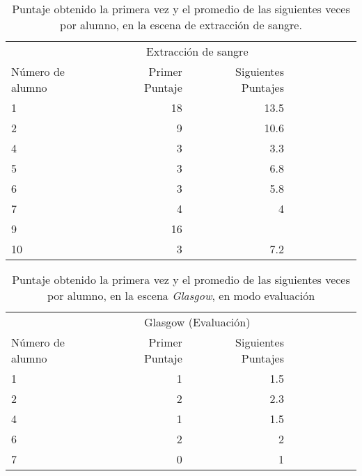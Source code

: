 \begin{table}[!hbt]
\centering
\begin{tabular}{lrrrrrrrr}
\toprule
                   & \multicolumn{2}{c}{Extracción de sangre} \\
                   \cmidrule(lr){2-3} 
Número de alumno   & Primer Puntaje                            & Siguientes Puntajes \\
\midrule
 1       & 18  & 13.5 \\
 2       & 9 & 10.6 \\
 4       & 3 & 3.3 \\
 5       & 3 & 6.8  \\
 6       & 3 & 5.8 \\
 7       & 4 & 4 \\
 9       & 16  &  \\
10       & 3 & 7.2 \\
\bottomrule
\end{tabular}
\caption{Puntaje obtenido la primera vez y el promedio de las siguientes veces por alumno, en la escena de
    extracción de sangre.}
\label{tab:log_hemocultivo_puntaje}
\end{table}


\begin{table}[!hbt]
\centering
\begin{tabular}{lrrrrrrrr}
\toprule
& \multicolumn{2}{c}{Glasgow (Evaluación)} \\
                   \cmidrule(lr){2-3} 
Número de alumno   & Primer Puntaje                            & Siguientes Puntajes \\
\midrule
1     & 1 & 1.5 \\
2     & 2 & 2.3 \\
4     & 1 & 1.5 \\
6     & 2 & 2 \\
7     & 0 & 1 \\
\bottomrule
\end{tabular}
\caption{Puntaje obtenido la primera vez y el promedio de las siguientes veces por alumno, en la escena
    \textit{Glasgow}, en modo evaluación}
\label{tab:log_glasgow_random_puntaje}
\end{table}
